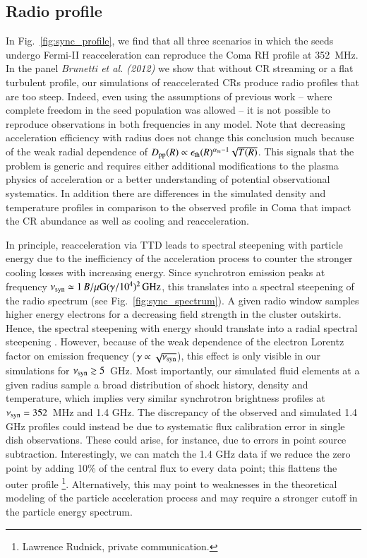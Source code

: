 \documentclass[useAMS,usenatbib]{mn2e}
\begin{document}
\subsection{Radio profile}
In Fig.~\ref{fig:sync_profile}, we find that all three scenarios in
which the seeds undergo Fermi-II reacceleration can reproduce the Coma
RH profile at 352~MHz. In the panel {\it Brunetti et al. (2012)} we
show that without CR streaming or a flat turbulent profile, our
simulations of reaccelerated CRs produce radio profiles that are too
steep. Indeed, even using the assumptions of previous work -- where
complete freedom in the seed population was allowed -- it is not
possible to reproduce observations in both frequencies in any
model. Note that decreasing acceleration efficiency with radius does
not change this conclusion much because of the weak radial dependence
of $D_{\mathrm{pp}}(R)\propto
\epsilon_{\mathrm{th}}(R)^{\alpha_{\mathrm{tu}}-1}\sqrt{T(R)}$. This
signals that the problem is generic and requires either additional
modifications to the plasma physics of acceleration or a better
understanding of potential observational systematics. In addition
there are differences in the simulated density and temperature
profiles in comparison to the observed profile in Coma that impact the
CR abundance as well as cooling and reacceleration.

In principle, reacceleration via TTD leads to spectral steepening with
particle energy due to the inefficiency of the acceleration process to
counter the stronger cooling losses with increasing energy. Since
synchrotron emission peaks at frequency $\nu_{\mathrm{syn}}\simeq 1\,
B/\mu{\mathrm{G}} (\gamma/10^4)^2\,{\mathrm{GHz}}$, this translates into a
spectral steepening of the radio spectrum (see
Fig.~\ref{fig:sync_spectrum}). A given radio window samples higher
energy electrons for a decreasing field strength in the cluster
outskirts. Hence, the spectral steepening with energy should translate
into a radial spectral steepening \citep{brunetti12}. However, because
of the weak dependence of the electron Lorentz factor on emission
frequency ($\gamma\propto\sqrt{\nu_{\mathrm{syn}}}$), this effect is only
visible in our simulations for $\nu_{\mathrm{syn}}\gtrsim5$~GHz. Most
importantly, our simulated fluid elements at a given radius sample a
broad distribution of shock history, density and temperature, which
implies very similar synchrotron brightness profiles at
$\nu_{\mathrm{syn}}=352$~MHz and 1.4 GHz. The discrepancy of the observed
and simulated 1.4 GHz profiles could instead be due to systematic flux
calibration error in single dish observations. These could arise, for
instance, due to errors in point source subtraction. Interestingly, we
can match the 1.4 GHz data if we reduce the zero point by adding 10\%
of the central flux to every data point; this flattens the outer
profile \footnote{Lawrence Rudnick, private communication.}.
Alternatively, this may point to weaknesses in the theoretical
modeling of the particle acceleration process and may require a
stronger cutoff in the particle energy spectrum.
\end{document}
